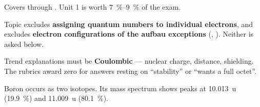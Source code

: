 \documentclass{apchem-exam}
\begin{document}
\apctitleblock

\begin{apcnote}
Covers  through . Unit 1 is worth
\SI{7}{\percent}--\SI{9}{\percent} of the exam.

Topic  excludes \textbf{assigning quantum numbers to individual
electrons}, and  excludes \textbf{electron configurations of the
aufbau exceptions} (, ). Neither is asked below.

Trend explanations must be \textbf{Coulombic} --- nuclear charge,
distance, shielding. The rubrics award zero for answers resting on
``stability'' or ``wants a full octet''.
\end{apcnote}



Boron occurs as two isotopes. Its mass spectrum shows peaks at
\SI{10.013}{\atomicmassunit} (\SI{19.9}{\percent}) and
\SI{11.009}{\atomicmassunit} (\SI{80.1}{\percent}).
\end{document}
